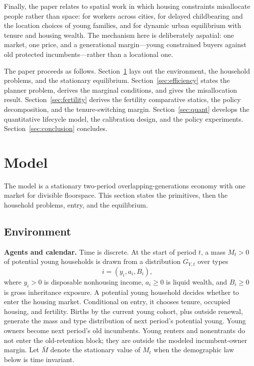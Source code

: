 \documentclass[11pt]{article}
\newcommand{\1}{\mathbf 1}
\begin{document}
Finally, the paper relates to spatial work in which housing constraints misallocate people rather than space: \citet{hsiehmoretti2019} for workers across cities, \citet{morenosantamaria2024} for delayed childbearing and the location choices of young families, and \citet{greaneyetal2025} for dynamic urban equilibrium with tenure and housing wealth. The mechanism here is deliberately aspatial: one market, one price, and a generational margin---young constrained buyers against old protected incumbents---rather than a locational one.

The paper proceeds as follows. Section~\ref{sec:model} lays out the environment, the household problems, and the stationary equilibrium. Section~\ref{sec:efficiency} states the planner problem, derives the marginal conditions, and gives the misallocation result. Section~\ref{sec:fertility} derives the fertility comparative statics, the policy decomposition, and the tenure-switching margin. Section~\ref{sec:quant} develops the quantitative lifecycle model, the calibration design, and the policy experiments. Section~\ref{sec:conclusion} concludes.

\section{Model}
\label{sec:model}

The model is a stationary two-period overlapping-generations economy with one market for divisible floorspace. This section states the primitives, then the household problems, entry, and the equilibrium.

\subsection{Environment}
\label{sec:environment}

\textbf{Agents and calendar.} Time is discrete. At the start of period $t$, a mass $M_t>0$ of potential young households is drawn from a distribution $G_{Y,t}$ over types
\[
i=(y_i,a_i,B_i),
\]
where $y_i>0$ is disposable nonhousing income, $a_i\ge0$ is liquid wealth, and $B_i\ge0$ is gross inheritance exposure. A potential young household decides whether to enter the housing market. Conditional on entry, it chooses tenure, occupied housing, and fertility. Births by the current young cohort, plus outside renewal, generate the mass and type distribution of next period's potential young. Young owners become next period's old incumbents. Young renters and nonentrants do not enter the old-retention block; they are outside the modeled incumbent-owner margin. Let $\bar M$ denote the stationary value of $M_t$ when the demographic law below is time invariant.
\end{document}
